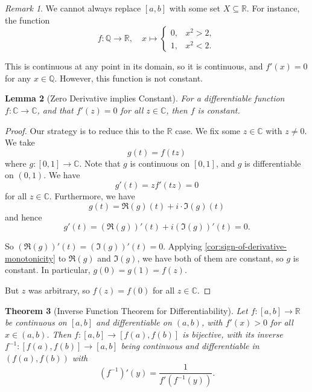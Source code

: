 \documentclass[11pt]{article}
\numberwithin{equation}{section}
\newtheorem{theorem}{Theorem}[section]
\newtheorem{lemma}[theorem]{Lemma}
\theoremstyle{definition}
\theoremstyle{remark}
\newtheorem{remark}[theorem]{Remark}
\newcommand{\pqty}[1]{\left(#1\right)}
\newcommand{\ccintv}[2]{[#1,#2]}
\newcommand{\oointv}[2]{(#1,#2)}
\newcommand{\functiondomain}[3]{#1:#2\to #3}
\newcommand{\function}[5]{#1:#2\to #3,\quad #4\mapsto #5}
\newcommand{\RR}{\mathbb R}
\newcommand{\CC}{\mathbb C}
\newcommand{\QQ}{\mathbb Q}
\newcommand{\inverse}{^{-1}}
\begin{document}
\begin{remark}\label{analysis-unit-0115}
    We cannot always replace \(\ccintv{a}{b}\) with some set \(X \subseteq \RR\). For instance, the function
    \[
        \function{f}{\QQ}{\RR}{x}{\begin{cases}
            0, & x^2 > 2, \\
            1, & x^2 < 2.
        \end{cases}}
    \]

    This is continuous at any point in its domain, so it is continuous, and \(f'\pqty{x} = 0\) for any \(x \in \QQ\). However, this function is not constant.
\end{remark}

\begin{lemma}[Zero Derivative implies Constant]\label{analysis-unit-0116}
    \label{lem:zero-derivative-constant}%
    For a differentiable function \(\functiondomain{f}{\CC}{\CC}\), and that \(f'\pqty{z} = 0\) for all \(z \in \CC\), then \(f\) is constant.
\end{lemma}

\begin{proof}
    Our strategy is to reduce this to the \(\RR\) case. We fix some \(z \in \CC\) with \(z \neq 0\). We take
    \[
        g\pqty{t} = f\pqty{tz}
    \]
    where \(\functiondomain{g}{\ccintv{0}{1}}{\CC}\). Note that \(g\) is continuous on \(\ccintv{0}{1}\), and \(g\) is differentiable on \(\oointv{0}{1}\). We have
    \[
        g'\pqty{t} = z f'\pqty{tz} = 0
    \]
    for all \(z \in \CC\). Furthermore, we have
    \[
        g\pqty{t} = \Re\pqty{g} \pqty{t} + i \cdot \Im\pqty{g} \pqty{t}
    \]
    and hence
    \[
        g'\pqty{t} = \pqty{\Re \pqty{g}}' \pqty{t} + i \pqty{\Im \pqty{g}}' \pqty{t} = 0.
    \]
    
    So \(\pqty{\Re\pqty{g}}' \pqty{t} = \pqty{\Im \pqty{g}}' \pqty{t} = 0\). Applying \autoref{cor:sign-of-derivative-monotonicity} to \(\Re\pqty{g}\) and \(\Im\pqty{g}\), we have both of them are constant, so \(g\) is constant. In particular, \(g\pqty{0} = g\pqty{1} = f\pqty{z}\).

    But \(z\) was arbitrary, so \(f\pqty{z} = f\pqty{0}\) for all \(z \in \CC\).
\end{proof}

\begin{theorem}[Inverse Function Theorem for Differentiability]\label{analysis-unit-0117}
    \label{thm:inverse-fn-thm-differentiable}%
    Let \(\functiondomain{f}{\ccintv{a}{b}}{\RR}\) be continuous on \(\ccintv{a}{b}\) and differentiable on \(\oointv{a}{b}\), with \(f'\pqty{x} > 0\) for all \(x \in \oointv{a}{b}\). Then \(\functiondomain{f}{\ccintv{a}{b}}{\ccintv{f\pqty{a}}{f\pqty{b}}}\) is bijective, with its inverse \(\functiondomain{f\inverse}{\ccintv{f\pqty{a}}{f\pqty{b}}}{\ccintv{a}{b}}\) being continuous and differentiable in \(\oointv{f\pqty{a}}{f\pqty{b}}\) with
    \[
        \pqty{f\inverse}' \pqty{y} = \frac{1}{f'\pqty{f\inverse\pqty{y}}}.
    \] 
\end{theorem}
\end{document}
